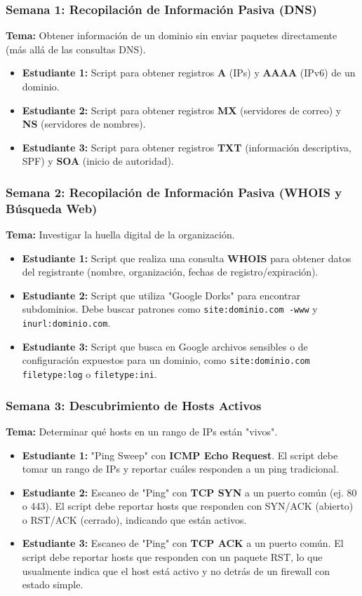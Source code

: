 \documentclass{article}
\begin{document}
\subsubsection*{Semana 1: Recopilación de Información Pasiva (DNS)}
\textbf{Tema:} Obtener información de un dominio sin enviar paquetes directamente (más allá de las consultas DNS).
\begin{itemize}
    \item \textbf{Estudiante 1:} Script para obtener registros \textbf{A} (IPs) y \textbf{AAAA} (IPv6) de un dominio.
    \item \textbf{Estudiante 2:} Script para obtener registros \textbf{MX} (servidores de correo) y \textbf{NS} (servidores de nombres).
    \item \textbf{Estudiante 3:} Script para obtener registros \textbf{TXT} (información descriptiva, SPF) y \textbf{SOA} (inicio de autoridad).
\end{itemize}

\subsubsection*{Semana 2: Recopilación de Información Pasiva (WHOIS y Búsqueda Web)}
\textbf{Tema:} Investigar la huella digital de la organización.
\begin{itemize}
    \item \textbf{Estudiante 1:} Script que realiza una consulta \textbf{WHOIS} para obtener datos del registrante (nombre, organización, fechas de registro/expiración).
    \item \textbf{Estudiante 2:} Script que utiliza "Google Dorks" para encontrar subdominios. Debe buscar patrones como \texttt{site:dominio.com -www} y \texttt{inurl:dominio.com}.
    \item \textbf{Estudiante 3:} Script que busca en Google archivos sensibles o de configuración expuestos para un dominio, como \texttt{site:dominio.com filetype:log} o \texttt{filetype:ini}.
\end{itemize}

\subsubsection*{Semana 3: Descubrimiento de Hosts Activos}
\textbf{Tema:} Determinar qué hosts en un rango de IPs están "vivos".
\begin{itemize}
    \item \textbf{Estudiante 1:} "Ping Sweep" con \textbf{ICMP Echo Request}. El script debe tomar un rango de IPs y reportar cuáles responden a un ping tradicional.
    \item \textbf{Estudiante 2:} Escaneo de "Ping" con \textbf{TCP SYN} a un puerto común (ej. 80 o 443). El script debe reportar hosts que responden con SYN/ACK (abierto) o RST/ACK (cerrado), indicando que están activos.
    \item \textbf{Estudiante 3:} Escaneo de "Ping" con \textbf{TCP ACK} a un puerto común. El script debe reportar hosts que responden con un paquete RST, lo que usualmente indica que el host está activo y no detrás de un firewall con estado simple.
\end{itemize}
\end{document}
